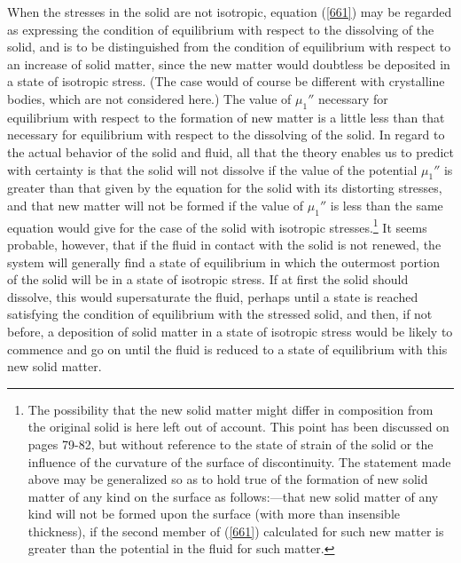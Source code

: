 \documentclass[12pt]{article}
\begin{document}
When the stresses in the solid are not isotropic, equation (\ref{661}) may be regarded as expressing the condition of equilibrium with respect to the dissolving of the solid, and is to be distinguished from the condition of equilibrium with respect to an increase of solid matter, since the new matter would doubtless be deposited in a state of isotropic stress. (The case would of course be different with crystalline bodies, which are not considered here.) The value of $\mu_1''$ necessary for equilibrium with respect to the formation of new matter is a little less than that necessary for equilibrium with respect to the dissolving of the solid. In regard to the actual behavior of the solid and fluid, all that the theory enables us to predict with certainty is that the solid will not dissolve if the value of the potential $\mu_1''$ is greater than that given by the equation for the solid with its distorting stresses, and that new matter will not be formed if the value of $\mu_1''$ is less than the same equation would give for the case of the solid with isotropic stresses.\footnote{The possibility that the new solid matter might differ in composition from the original solid is here left out of account. This point has been discussed on pages 79-82, but without reference to the state of strain of the solid or the influence of the curvature of the surface of discontinuity. The statement made above may be generalized so as to hold true of the formation of new solid matter of any kind on the surface as follows:---that new solid matter of any kind will not be formed upon the surface (with more than insensible thickness), if the second member of (\ref{661}) calculated for such new matter is greater than the potential in the fluid for such matter.} It seems probable, however, that if the fluid in contact with the solid is not renewed, the system will generally find a state of equilibrium in which the outermost portion of the solid will be in a state of isotropic stress. If at first the solid should dissolve, this would supersaturate the fluid, perhaps until a state is reached satisfying the condition of equilibrium with the stressed solid, and then, if not before, a deposition of solid matter in a state of isotropic stress would be likely to commence and go on until the fluid is reduced to a state of equilibrium with this new solid matter.
\end{document}
